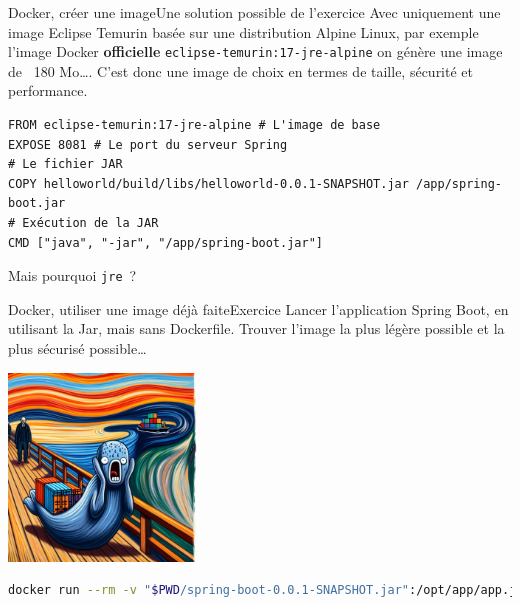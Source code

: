 \documentclass{beamer}
\begin{document}
    \begin{frame}[fragile]{Docker, créer une image}{Une solution possible de l'exercice}
        Avec uniquement une image Eclipse Temurin basée sur une distribution Alpine Linux, par exemple l'image Docker \textbf{officielle} \lstinline{eclipse-temurin:17-jre-alpine} on génère une image de  ~180 Mo\ldots.
        \bigbreak
        \bigbreak
        C'est donc une image de choix en termes de taille, sécurité et performance.

        \begin{lstlisting}
FROM eclipse-temurin:17-jre-alpine # L'image de base
EXPOSE 8081 # Le port du serveur Spring
# Le fichier JAR
COPY helloworld/build/libs/helloworld-0.0.1-SNAPSHOT.jar /app/spring-boot.jar
# Exécution de la JAR
CMD ["java", "-jar", "/app/spring-boot.jar"]
        \end{lstlisting}
        Mais pourquoi \lstinline{jre}~?
    \end{frame}

    \begin{frame}[fragile]{Docker, utiliser une image déjà faite}{Exercice \execcounterdispinc{}}
        Lancer l'application Spring Boot, en utilisant la Jar, mais sans Dockerfile.
        \bigbreak
        Trouver l'image la plus légère possible et la plus sécurisé possible\ldots
        \bigbreak
        \begin{center}
            \includegraphics[width=5cm]{image/whale-scream}
        \end{center}
        \pause
        \begin{lstlisting}[language=bash,basicstyle=\ttfamily\tiny]
docker run --rm -v "$PWD/spring-boot-0.0.1-SNAPSHOT.jar":/opt/app/app.jar -p 8080:8080 eclipse-temurin:17-jre-alpine java -jar /opt/app/app.jar
        \end{lstlisting}
    \end{frame}
\end{document}
